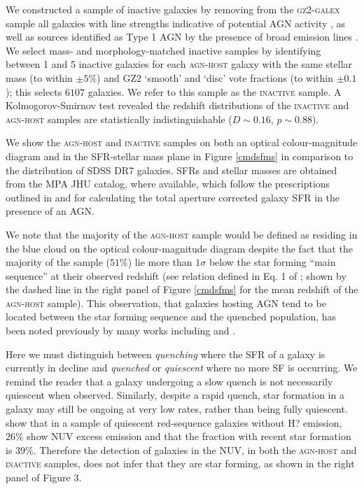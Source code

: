 \documentclass[useAMS,usenatbib]{mn2e}
\def\changed    {\color{nc} }
\def\newref    {\color{new} }
\begin{document}
We constructed a sample of inactive galaxies by removing from the \textsc{gz2-galex} sample {\changed all galaxies with line strengths indicative of potential AGN activity \citep*{Kauff03b}}, as well as sources identified as Type 1 AGN by the presence of broad emission lines \citep{Oh15}. {\changed We select mass- and morphology-matched inactive samples by identifying between 1 and 5 inactive galaxies for each \textsc{agn-host} galaxy with the same stellar mass (to within $\pm5\%$) and GZ2 `smooth' and `disc' vote fractions (to within $\pm 0.1$); this selects $6107$ galaxies.} We refer to this sample as the \textsc{inactive} sample. A Kolmogorov-Smirnov test revealed the redshift distributions of the \textsc{inactive} and \textsc{agn-host} samples are statistically indistinguishable ($D \sim 0.16$, $p \sim 0.88$). 


{\newref We show the \textsc{agn-host} and \textsc{inactive}  samples on both an optical colour-magnitude diagram and in the SFR-stellar mass plane in Figure \ref{cmdsfms} in comparison to the distribution of SDSS DR7 galaxies. SFRs and stellar masses are obtained from the MPA JHU catalog, where available, which follow the prescriptions outlined in \cite{Brinch04} and \cite{Salim07} for calculating the total aperture corrected galaxy SFR in the presence of an AGN. 

We note that the majority of the \textsc{agn-host} sample would be defined as residing in the blue cloud on the optical colour-magnitude diagram despite the fact that the majority of the sample ($51\%$) lie more than $1\sigma$ below the star forming ``main sequence'' at their observed redshift (see relation defined in Eq. 1 of \cite{Peng10}; shown by the dashed line in the right panel of Figure \ref{cmdsfms} for the mean redshift of the \textsc{agn-host} sample). This observation, that galaxies hosting AGN tend to be located between the star forming sequence and the quenched population, has been noted previously by many works including \citet{Salim07,Sch2010, Shimzu15} and \citet{Ellison16}. }

{\newref Here we must distinguish between \emph{quenching} where the SFR of a galaxy is currently in decline and \emph{quenched} or \emph{quiescent} where no more SF is occurring. We remind the reader that a galaxy undergoing a slow quench is not necessarily quiescent when observed. Similarly, despite a rapid quench, star formation in a galaxy may still be ongoing at very low rates, rather than being fully quiescent. \cite{Ko13} show that in a sample of quiescent red-sequence galaxies without H? emission, $26\%$ show NUV excess emission and that the fraction with recent star formation is $39\%$. Therefore the detection of galaxies in the NUV, in both the \textsc{agn-host} and \textsc{inactive} samples, does not infer that they are star forming, as shown in the right panel of Figure 3.}
\end{document}
